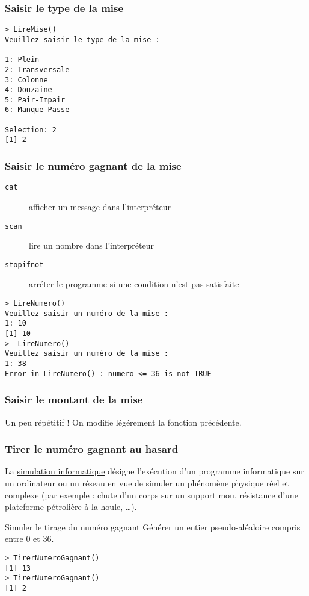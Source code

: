 \documentclass[10pt]{beamer}
\begin{document}
\begin{frame}[fragile]
  \frametitle{Saisir le type de la mise}
  
  \begin{lstlisting}
> LireMise()
Veuillez saisir le type de la mise :  

1: Plein
2: Transversale
3: Colonne
4: Douzaine
5: Pair-Impair
6: Manque-Passe

Selection: 2
[1] 2    
\end{lstlisting}

\end{frame}

\begin{frame}[fragile]
  \frametitle{Saisir le numéro gagnant de la mise}  
  \begin{description}
  \item[\texttt{cat}] afficher un message dans l'interpréteur
  \item[\texttt{scan}] lire un nombre dans l'interpréteur
  \item[\texttt{stopifnot}] arréter le programme si une condition n'est pas satisfaite
  \end{description}
  

  \begin{lstlisting}
> LireNumero()
Veuillez saisir un numéro de la mise :
1: 10
[1] 10
>  LireNumero()
Veuillez saisir un numéro de la mise :
1: 38
Error in LireNumero() : numero <= 36 is not TRUE      
\end{lstlisting}
\end{frame}


\begin{frame}[fragile]
  \frametitle{Saisir le montant de la mise}
  Un peu répétitif ! On modifie légérement la fonction précédente.
  
\end{frame}


\begin{frame}[fragile]
  \frametitle{Tirer le numéro gagnant au hasard}
    La \href{https://fr.wikipedia.org/wiki/Simulation_informatique}{simulation informatique} désigne l'exécution d'un programme informatique sur un ordinateur ou un réseau en vue de simuler un phénomène physique réel et complexe (par exemple : chute d’un corps sur un support mou, résistance d’une plateforme pétrolière à la houle, \dots).

    \begin{block}{Simuler le tirage du numéro gagnant}
      Générer un entier \alert{pseudo-aléaloire} compris entre 0 et 36.
    \end{block}
    
    \begin{lstlisting}
> TirerNumeroGagnant()
[1] 13
> TirerNumeroGagnant()
[1] 2
\end{lstlisting}
\end{frame}
\end{document}

